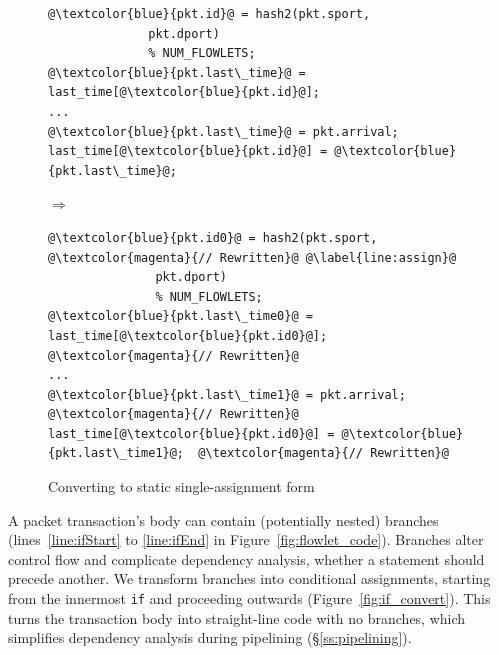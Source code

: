 \begin{figure}[!t]
  \begin{minipage}{\textwidth}
  \begin{minipage}{0.4\textwidth}
  \begin{small}
  \begin{lstlisting}[style=customcscriptsize, numbers=none, frame=none]
@\textcolor{blue}{pkt.id}@ = hash2(pkt.sport,
              pkt.dport)
              % NUM_FLOWLETS;
@\textcolor{blue}{pkt.last\_time}@ = last_time[@\textcolor{blue}{pkt.id}@];
...
@\textcolor{blue}{pkt.last\_time}@ = pkt.arrival;
last_time[@\textcolor{blue}{pkt.id}@] = @\textcolor{blue}{pkt.last\_time}@;
  \end{lstlisting}
  \end{small}
  \end{minipage}
  $\Longrightarrow$
  \hspace{-0.2in}
%
  \begin{minipage}{0.6\textwidth}
  \begin{small}
  \begin{lstlisting}[style=customcscriptsize, numbers=none, frame=none]
@\textcolor{blue}{pkt.id0}@ = hash2(pkt.sport,            @\textcolor{magenta}{// Rewritten}@ @\label{line:assign}@
               pkt.dport)
               % NUM_FLOWLETS;  
@\textcolor{blue}{pkt.last\_time0}@ = last_time[@\textcolor{blue}{pkt.id0}@];  @\textcolor{magenta}{// Rewritten}@
...
@\textcolor{blue}{pkt.last\_time1}@ = pkt.arrival;         @\textcolor{magenta}{// Rewritten}@
last_time[@\textcolor{blue}{pkt.id0}@] = @\textcolor{blue}{pkt.last\_time1}@;  @\textcolor{magenta}{// Rewritten}@
  \end{lstlisting}
  \end{small}
  \end{minipage}
  \caption[title]{Converting to static single-assignment form}
  \label{fig:ssa}
\end{minipage}
\end{figure}



 A packet transaction's body can contain (potentially
nested) branches (\eg lines~\ref{line:ifStart} to \ref{line:ifEnd} in
Figure~\ref{fig:flowlet_code}).  Branches alter control flow and complicate
dependency analysis, \ie whether a statement should precede another.  We
transform branches into conditional assignments, starting from the innermost
\texttt{if} and proceeding outwards (Figure~\ref{fig:if_convert}).  This turns
the transaction body into straight-line code with no branches, which simplifies
dependency analysis during pipelining (\S\ref{ss:pipelining}).

